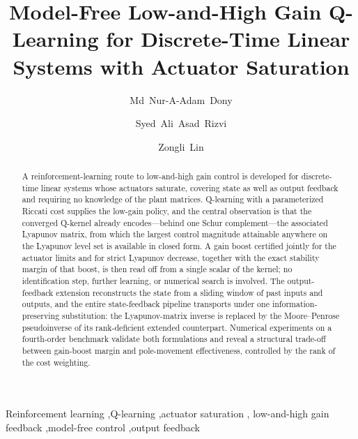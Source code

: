 \documentclass[final,5p,times,authoryear]{elsarticle}
\theoremstyle{plain}
\theoremstyle{definition}
\theoremstyle{remark}
\begin{document}
\begin{frontmatter}

\title{Model-Free Low-and-High Gain Q-Learning for Discrete-Time
Linear Systems with Actuator Saturation}

\author[ttu]{Md~Nur-A-Adam~Dony}
\author[ttu]{Syed~Ali~Asad~Rizvi}
\author[uva]{Zongli~Lin}
\address[ttu]{Department of Electrical and Computer Engineering,
Tennessee Technological University, Cookeville, TN 38505, USA}
\address[uva]{Charles L.~Brown Department of Electrical and Computer
Engineering, University of Virginia, Charlottesville, VA 22903, USA}

\begin{abstract}
A reinforcement-learning route to low-and-high gain control is
developed for discrete-time linear systems whose actuators saturate,
covering state as well as output feedback and requiring no knowledge
of the plant matrices.  Q-learning with a parameterized Riccati cost
supplies the low-gain policy, and the central observation is that the
converged Q-kernel already encodes---behind one Schur complement---the
associated Lyapunov matrix, from which the largest control magnitude
attainable anywhere on the Lyapunov level set is available in closed
form.  A gain boost certified jointly for the actuator limits and for
strict Lyapunov decrease, together with the exact stability margin of
that boost, is then read off from a single scalar of the kernel; no
identification step, further learning, or numerical search is
involved.  The output-feedback extension reconstructs
the state from a sliding window of past inputs and outputs, and the
entire state-feedback pipeline transports under one
information-preserving substitution: the Lyapunov-matrix inverse is
replaced by the Moore--Penrose pseudoinverse of its rank-deficient
extended counterpart.  Numerical experiments on a fourth-order
benchmark validate both formulations and reveal a structural trade-off
between gain-boost margin and pole-movement effectiveness, controlled
by the rank of the cost weighting.
\end{abstract}

\begin{keyword}
Reinforcement learning \sep Q-learning \sep actuator saturation \sep
low-and-high gain feedback \sep model-free control \sep output feedback
\end{keyword}

\end{frontmatter}
\end{document}

